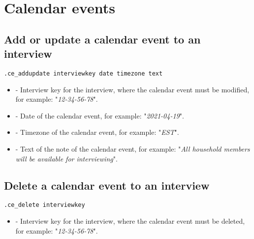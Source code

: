 \section{Calendar events}
\subsection{Add or update a calendar event to an interview}
\begin{lstlisting}[style=CommandLineStyle]
.ce_addupdate interviewkey date timezone text
\end{lstlisting}

\paramsheader
\begin{itemize}
  \item {} - Interview key for the interview, where the calendar event must be modified, for example: "\textit{12-34-56-78}".
  \item {} - Date of the calendar event, for example: "\textit{2021-04-19}".
  \item {} - Timezone of the calendar event, for example: "\textit{EST}".
  \item {} - Text of the note of the calendar event, for example: "\textit{All household members will be available for interviewing}".
\end{itemize}

\subsection{Delete a calendar event to an interview}
\begin{lstlisting}[style=CommandLineStyle]
.ce_delete interviewkey
\end{lstlisting}

\paramsheader
\begin{itemize}
\item {} - Interview key for the interview, where the calendar event must be deleted, for example: "\textit{12-34-56-78}".
\end{itemize}
